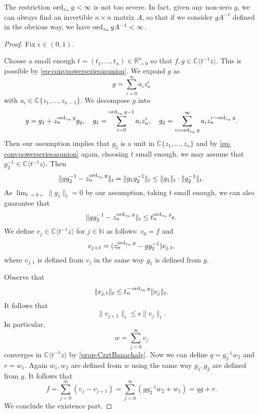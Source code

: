 \begin{remark}\label{rmk-perturbaxes}
    The restriction $\operatorname{ord}_{z_n}g<\infty$ is not too severe. In fact, given any non-zero $g$, we can always find an invertible $n\times n$ matrix $A$, so that if we consider $gA^{-1}$ defined in the obvious way, we have $\operatorname{ord}_{z_n}gA^{-1}<\infty$. 
\end{remark}

\begin{proof}
    Fix $\epsilon\in (0,1)$.

    Choose a small enough $t=(t_1,\ldots,t_n)\in \mathbb{R}^n_{>0}$ so that $f,g\in \mathbb{C}\langle t^{-1}z\rangle$. This is possible by \eqref{eq-convpowerseriesasunion}. 
    We expand $g$ as
    \begin{equation}\label{eq-gexpandzn}
      g=\sum_{i=0}^{\infty}a_iz_n^i  
    \end{equation}
    with $a_i\in \mathbb{C}\{ z_1,\ldots,z_{n-1}\}$.
    We decompose $g$ into 
    \[
      g=g_1+z_n^{\operatorname{ord}_{z_n}g} g_2,\quad g_1=\sum_{i=0}^{\operatorname{ord}_{z_n}g-1}a_iz_n^i,\quad  g_2=\sum_{i=\operatorname{ord}_{z_n}g}^{\infty}a_i z_n^{i-\operatorname{ord}_{z_n}g}.
    \]
    Then our assumption implies that $g_2$ is a unit in  $\mathbb{C}\{ z_1,\ldots,z_n\}$ and by \eqref{eq-convpowerseriesasunion} again, choosing $t$ small enough, we may assume that $g_2^{-1}\in \mathbb{C}\langle t^{-1}z\rangle$. Then
    \[
      \|gg_{2}^{-1}-z_n^{\operatorname{ord}_{z_n}g}\|_{t}=\|g_1g_{2}^{-1} \|_t \leq  \|g_1\|_t\cdot\|g_{2}^{-1} \|_t.
    \]
    As $\lim_{t\to 0+}\|g_1\|_t=0$ by our assumption, taking $t$ small enough, we can also guarantee that 
    \[
        \|gg_{2}^{-1}-z_n^{\operatorname{ord}_{z_n}g}\|_{t}\leq t_n^{\operatorname{ord}_{z_n}g}\epsilon.  
    \]
    We define $v_{j}\in \mathbb{C}\langle t^{-1}z\rangle$ for $j\in \mathbb{N}$ as follows: $v_0=f$ and
    \[
         v_{j+1} = (z_n^{\operatorname{ord}_{z_n}g}- gg_{2}^{-1})v_{j,1},
    \]
    where $v_{j,1}$ is defined from $v_j$ in the same way $g_1$ is defined from $g$.

    Observe that
    \[
        \|v_{j,1}\|_t\leq t_n^{-\operatorname{ord}_{z_n}g}\|v_j\|_t.
    \]
    It follows that
    \[
        \|v_{j+1}\|_t\leq \epsilon\|v_j\|_t.  
    \]
    In particular, 
    \[
        w=\sum_{j=0}^{\infty}v_j  
    \]
    converges in $\mathbb{C}\langle t^{-1}z\rangle$ by \cref{prop-CzztBanachalg}. Now we can define $q=g_{2}^{-1}w_2$ and $r=w_1$. Again $w_1,w_2$ are defined from $w$ using the same way $g_1,g_2$ are defined from $g$.
    It follows that
    \[
        f=\sum_{j=0}^{\infty}(v_j-v_{j+1})=\sum_{j=0}^{\infty} (gg_2^{-1}w_2+w_1)=qg+r.
    \]
    We conclude the existence part.


\end{proof}
